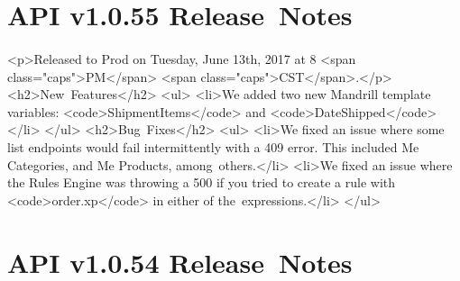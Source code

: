 \documentclass{memoir}%
\begin{document}
%
\section*{API v1.0.55 Release~Notes}%
\paragraph*{}%

%
\paragraph*{}%
<p>Released to Prod on Tuesday, June 13th, 2017 at 8 <span class="caps">PM</span> <span class="caps">CST</span>.</p>\newline%
<h2>New~Features</h2>\newline%
<ul>\newline%
<li>We added two new Mandrill template variables: <code>ShipmentItems</code> and <code>DateShipped</code></li>\newline%
</ul>\newline%
<h2>Bug~Fixes</h2>\newline%
<ul>\newline%
<li>We fixed an issue where some list endpoints would fail intermittently with a 409 error. This included Me Categories, and Me Products, among~others.</li>\newline%
<li>We fixed an issue where the Rules Engine was throwing a 500 if you tried to create a rule with <code>order.xp</code> in either of the~expressions.</li>\newline%
</ul>

%
\section*{API v1.0.54 Release~Notes}%
\paragraph*{}%

%
\end{document}
